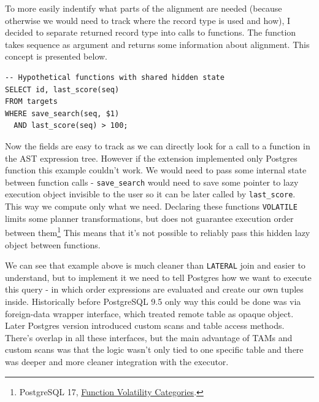 To more easily indentify what parts of the alignment are needed (because otherwise we would need to track where the record type is used and how), I decided to separate returned record type into calls to functions.
The function takes sequence as argument and returns some information about alignment. This concept is presented below.

\noindent\begin{minipage}{\linewidth}
\begin{lstlisting}[style=bioseq-search-sql,caption={Problematic "hidden state" example}]
-- Hypothetical functions with shared hidden state
SELECT id, last_score(seq)
FROM targets
WHERE save_search(seq, $1)
  AND last_score(seq) > 100;
\end{lstlisting}
\end{minipage}

Now the fields are easy to track as we can directly look for a call to a function in the AST expression tree. 
However if the extension implemented only Postgres function this example couldn't work. 
We would need to pass some internal state between function calls - \texttt{save\_search} would need to save some pointer
to lazy execution object invisible to the user so it can be later called by \texttt{last\_score}. This way we compute only what we need.
Declaring these functions \texttt{VOLATILE} limits some planner transformations, but does not
guarantee execution order between them\footnote{PostgreSQL 17,
\href{https://www.postgresql.org/docs/17/xfunc-volatility.html}
{Function Volatility Categories}.}
This means that it's not possible to reliably pass this hidden lazy object between functions.

We can see that example above is much cleaner than \texttt{LATERAL} join and easier to understand, but to implement it we need to 
tell Postgres how we want to execute this query - in which order expressions are evaluated and create our own tuples inside.
Historically before PostgreSQL 9.5 only way this could be done was via foreign-data wrapper interface, which treated remote table as opaque object.
Later Postgres version introduced custom scans and table access methods. There's overlap in all these interfaces, but the main advantage of TAMs and custom scans was
that the logic wasn't only tied to one specific table and there was deeper and more cleaner integration with the executor.

